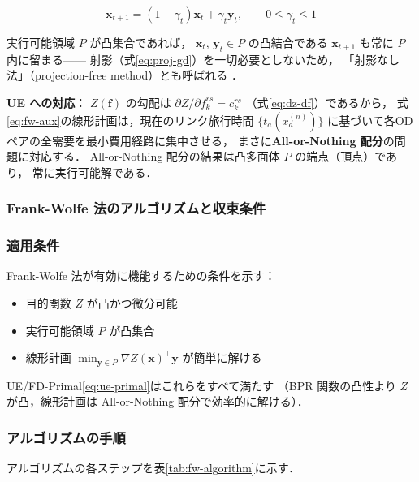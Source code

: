 \begin{equation}
  \boldsymbol{x}_{t+1}
  = (1-\gamma_t)\boldsymbol{x}_t + \gamma_t \boldsymbol{y}_t,
  \qquad 0 \leq \gamma_t \leq 1
  \label{eq:fw-update}
\end{equation}

実行可能領域 $P$ が凸集合であれば，
$\boldsymbol{x}_t,\,\boldsymbol{y}_t \in P$ の凸結合である
$\boldsymbol{x}_{t+1}$ も常に $P$ 内に留まる——
射影（式\eqref{eq:proj-gd}）を一切必要としないため，
「射影なし法」（projection-free method）とも呼ばれる
\cite{Pokutta2024}．

\textbf{UE への対応}：
$Z(\boldsymbol{f})$ の勾配は $\partial Z/\partial f_k^{rs} = c_k^{rs}$
（式\eqref{eq:dz-df}）であるから，
式\eqref{eq:fw-aux}の線形計画は，現在のリンク旅行時間
$\{t_a(x_a^{(n)})\}$ に基づいて各ODペアの全需要を最小費用経路に集中させる，
まさに\textbf{All-or-Nothing 配分}の問題に対応する．
All-or-Nothing 配分の結果は凸多面体 $P$ の端点（頂点）であり，
常に実行可能解である．

\subsubsection{Frank-Wolfe 法のアルゴリズムと収束条件}
\label{subsubsec:fw-algorithm}

\subsubsection*{適用条件}

Frank-Wolfe 法が有効に機能するための条件を示す\cite{Pokutta2024}：

\begin{itemize}
  \item 目的関数 $Z$ が凸かつ微分可能
  \item 実行可能領域 $P$ が凸集合
  \item 線形計画 $\min_{\boldsymbol{y} \in P} \nabla Z(\boldsymbol{x})^{\!\top} \boldsymbol{y}$
        が簡単に解ける
\end{itemize}

UE/FD-Primal\eqref{eq:ue-primal}はこれらをすべて満たす
（BPR 関数の凸性より $Z$ が凸，線形計画は All-or-Nothing 配分で効率的に解ける）．

\subsubsection*{アルゴリズムの手順}

アルゴリズムの各ステップを表\ref{tab:fw-algorithm}に示す．


